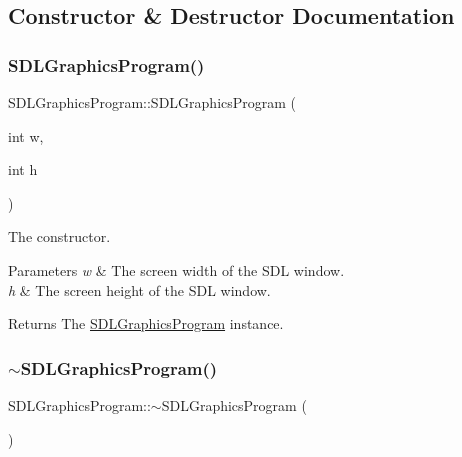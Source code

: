 \subsection{Constructor \& Destructor Documentation}
\mbox{\label{class_s_d_l_graphics_program_a976683178e086cd2a1a801fd9c501a7b}} 
\subsubsection{\texorpdfstring{SDLGraphicsProgram()}{SDLGraphicsProgram()}}
{\footnotesize\ttfamily S\+D\+L\+Graphics\+Program\+::\+S\+D\+L\+Graphics\+Program (\begin{DoxyParamCaption}\item[{int}]{w,  }\item[{int}]{h }\end{DoxyParamCaption})}



The constructor. 


\begin{DoxyParams}{Parameters}
{\em w} & The screen width of the S\+DL window. \\
\hline
{\em h} & The screen height of the S\+DL window. \\
\hline
\end{DoxyParams}
\begin{DoxyReturn}{Returns}
The \mbox{\hyperlink{class_s_d_l_graphics_program}{S\+D\+L\+Graphics\+Program}} instance. 
\end{DoxyReturn}
\mbox{\label{class_s_d_l_graphics_program_a2504412e7eaa011a1116447eb4d5ec00}} 
\subsubsection{\texorpdfstring{$\sim$SDLGraphicsProgram()}{~SDLGraphicsProgram()}}
{\footnotesize\ttfamily S\+D\+L\+Graphics\+Program\+::$\sim$\+S\+D\+L\+Graphics\+Program (\begin{DoxyParamCaption}{ }\end{DoxyParamCaption})}



